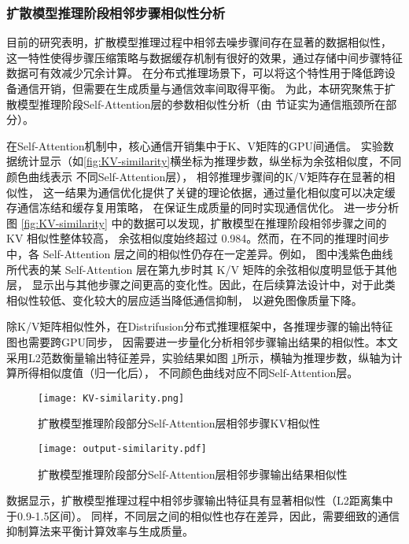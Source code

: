 \subsubsection{扩散模型推理阶段相邻步骤相似性分析}
\label{sec:diffusion_model_inference_process_similarity}
目前的研究表明，扩散模型推理过程中相邻去噪步骤间存在显著的数据相似性\cite{Cao2022ASO}，
这一特性使得步骤压缩策略与数据缓存机制有很好的效果，通过存储中间步骤特征数据可有效减少冗余计算\cite{Ma2023DeepCacheAD, Zhang2024FasterDV}。
在分布式推理场景下，可以将这个特性用于降低跨设备通信开销，但需要在生成质量与通信效率间取得平衡。
为此，本研究聚焦于扩散模型推理阶段Self-Attention层的参数相似性分析（由\label{sec:diffusion_model_distributed_inference_communication_parameter}
节证实为通信瓶颈所在部分）。
\par
在Self-Attention机制中，核心通信开销集中于K、V矩阵的GPU间通信。
实验数据统计显示（如\autoref{fig:KV-similarity}横坐标为推理步数，纵坐标为余弦相似度，不同颜色曲线表示
不同Self-Attention层），
相邻推理步骤间的K/V矩阵存在显著的相似性，
这一结果为通信优化提供了关键的理论依据，通过量化相似度可以决定缓存通信冻结和缓存复用策略，
在保证生成质量的同时实现通信优化\cite{Liu2021AutoFreezeAF}。
进一步分析图 \ref{fig:KV-similarity} 中的数据可以发现，扩散模型在推理阶段相邻步骤之间的 KV 相似性整体较高，
余弦相似度始终超过 0.984。然而，在不同的推理时间步中，各 Self-Attention 层之间的相似性仍存在一定差异。例如，
图中浅紫色曲线所代表的某 Self-Attention 层在第九步时其 K/V 矩阵的余弦相似度明显低于其他层，
显示出与其他步骤之间更高的变化性。因此，在后续算法设计中，对于此类相似性较低、变化较大的层应适当降低通信抑制，
以避免图像质量下降。
\par
除K/V矩阵相似性外，在Distrifusion分布式推理框架中，各推理步骤的输出特征图也需要跨GPU同步，
因需要进一步量化分析相邻步骤输出结果的相似性。本文采用L2范数衡量输出特征差异，实验结果如图
\ref{fig:output-similarity}所示，横轴为推理步数，纵轴为计算所得相似度值（归一化后），
不同颜色曲线对应不同Self-Attention层。
\begin{figure}[ht]
    \centering
    \begin{minipage}[t]{0.45\linewidth}
        \centering
        \texttt{[image: KV-similarity.png]}
        \caption{扩散模型推理阶段部分Self-Attention层相邻步骤KV相似性}
        \label{fig:KV-similarity}
    \end{minipage}
    \hfill %
    \begin{minipage}[t]{0.45\linewidth}
        \centering
        \texttt{[image: output-similarity.pdf]}
        \caption{扩散模型推理阶段部分Self-Attention层相邻步骤输出结果相似性}
        \label{fig:output-similarity}
    \end{minipage}
\end{figure}
数据显示，扩散模型推理过程中相邻步骤输出特征具有显著相似性（L2距离集中于0.9-1.5区间）。
同样，不同层之间的相似性也存在差异，因此，需要细致的通信抑制算法来平衡计算效率与生成质量。
